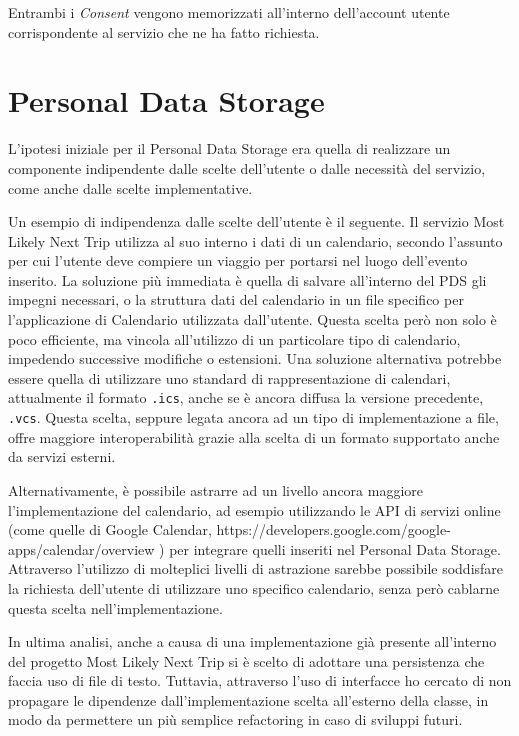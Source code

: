 Entrambi i \textit{Consent} vengono memorizzati all’interno dell’account utente corrispondente al servizio che ne ha fatto richiesta.

\section{Personal Data Storage}
L’ipotesi iniziale per il Personal Data Storage era quella di realizzare un componente indipendente dalle scelte dell’utente o dalle necessit\`a del servizio, come anche dalle scelte implementative. 

Un esempio di indipendenza dalle scelte dell’utente \`e il seguente. Il servizio Most Likely Next Trip utilizza al suo interno i dati di un calendario, secondo l’assunto per cui l’utente deve compiere un viaggio per portarsi nel luogo dell’evento inserito. La soluzione pi\`u immediata \`e quella di salvare all’interno del PDS gli impegni necessari, o la struttura dati del calendario in un file specifico per l’applicazione di Calendario utilizzata dall’utente. Questa scelta per\`o non solo \`e poco efficiente, ma vincola all’utilizzo di un particolare tipo di calendario, impedendo successive modifiche o estensioni. Una soluzione alternativa potrebbe essere quella di utilizzare uno standard di rappresentazione di calendari, attualmente il formato \texttt{.ics}, anche se \`e ancora diffusa la versione precedente, \texttt{.vcs}. Questa scelta, seppure legata ancora ad un tipo di implementazione a file, offre maggiore interoperabilit\`a grazie alla scelta di un formato supportato anche da servizi esterni.

Alternativamente, \`e possibile astrarre ad un livello ancora maggiore l’implementazione del calendario, ad esempio utilizzando le API di servizi online (come quelle di Google Calendar, https://developers.google.com/google-apps/calendar/overview ) per integrare quelli inseriti nel Personal Data Storage. Attraverso l’utilizzo di molteplici livelli di astrazione sarebbe possibile soddisfare la richiesta dell’utente di utilizzare uno specifico calendario, senza per\`o cablarne questa scelta nell’implementazione.

In ultima analisi, anche a causa di una implementazione gi\`a presente all’interno del progetto Most Likely Next Trip si \`e scelto di adottare una persistenza che faccia uso di file di testo. Tuttavia, attraverso l’uso di interfacce ho cercato di non propagare le dipendenze dall’implementazione scelta all’esterno della classe, in modo da permettere un pi\`u semplice refactoring in caso di sviluppi futuri.

